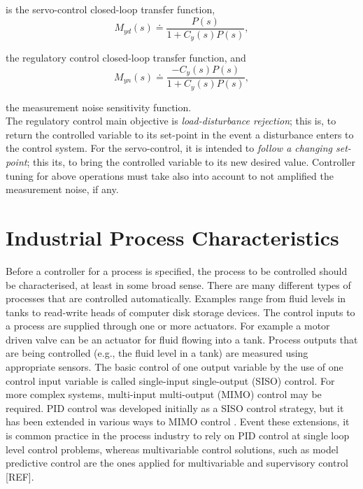 \noindent is the servo-control closed-loop transfer function, 
\begin{equation}
	M_{yd}(s) \doteq \frac{P(s)}{1+C_y(s)P(s)}, \label{eq:myd}
\end{equation}

\noindent the regulatory control closed-loop transfer function, and
\begin{equation}
	M_{yn}(s) \doteq \frac{-C_y(s)P(s)}{1+C_y(s)P(s)}, \label{eq:myn}
\end{equation}

\noindent the measurement noise sensitivity function.\\

The regulatory control main objective is \emph{load-disturbance rejection}; this is, to return the controlled variable to its set-point in the event a disturbance enters to the control system.  For the servo-control, it is intended to \emph{follow a changing set-point}; this its, to bring the controlled variable to its new desired value. Controller tuning for above operations must take also into account to not amplified the measurement noise, if any.\\



\section{Industrial Process Characteristics}
\label{sec:2}

Before a controller for a process is specified, the process to be controlled should be characterised, at least in some broad sense. There are many different types of processes that are controlled automatically. Examples range from fluid levels in tanks to read-write heads of computer disk storage devices. The control inputs to a process are supplied through one or more actuators. For example a motor driven valve can be an actuator for fluid flowing into a tank. Process outputs that are being controlled (e.g., the fluid level in a tank) are measured using appropriate sensors. The basic control of one output variable by the use of one control input variable is called single-input single-output (SISO) control. For more complex systems, multi-input multi-output (MIMO) control may be required. PID control was developed initially as a SISO control strategy, but it has been extended in various ways to MIMO control \cite{wang2008}. Event these extensions, it is common practice in the process industry to rely on PID control at single loop level control problems, whereas multivariable control solutions, such as model predictive control are the ones applied for multivariable and supervisory control [REF].\\

